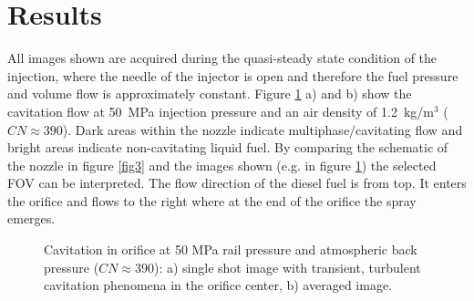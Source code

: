 \documentclass[letterpaper,twocolumn,10pt]{ilass}
\begin{document}
\section*{Results}

All images shown are acquired during the quasi-steady state condition of the injection,
where the needle of the injector is open and therefore the fuel pressure and volume flow
is approximately constant. Figure \ref{fig4} a) and b) show the cavitation flow at 50~MPa
injection pressure and an air density of 1.2~kg/m$^3$ ($CN \approx 390$). Dark areas
within the nozzle indicate multiphase/cavitating flow and bright areas indicate
non-cavitating liquid fuel.
%
By comparing the schematic of the nozzle in figure \ref{fig3} and the images shown
(e.g. in figure \ref{fig4}) the selected FOV can be interpreted. The flow direction of the
diesel fuel is from top. It enters the orifice and flows to the right where at the end of the
orifice the spray emerges.


\begin{figure}[h]
\begin{center}
\end{center}
\vspace*{-10mm}
\caption{Cavitation in orifice at 50 MPa rail pressure and atmospheric back pressure
         ($CN \approx 390$): a) single shot image with transient, turbulent cavitation
				 phenomena in the orifice center, b) averaged image.}
\label{fig4} 
\end{figure}
\end{document}
